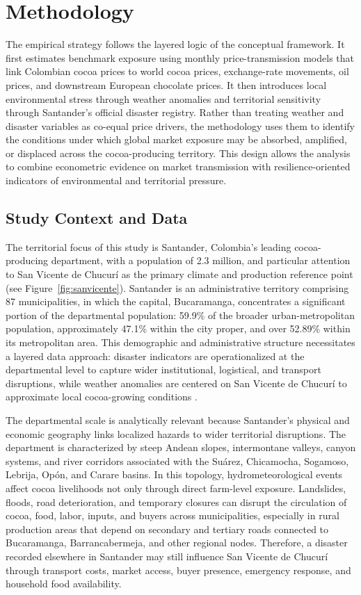 \documentclass[11pt]{article}
\begin{document}
\section{Methodology}
\label{sec:methods}
The empirical strategy follows the layered logic of the conceptual framework. It first estimates benchmark exposure using monthly price-transmission models that link Colombian cocoa prices to world cocoa prices, exchange-rate movements, oil prices, and downstream European chocolate prices. It then introduces local environmental stress through weather anomalies and territorial sensitivity through Santander's official disaster registry. Rather than treating weather and disaster variables as co-equal price drivers, the methodology uses them to identify the conditions under which global market exposure may be absorbed, amplified, or displaced across the cocoa-producing territory. This design allows the analysis to combine econometric evidence on market transmission with resilience-oriented indicators of environmental and territorial pressure.

\subsection{Study Context and Data}
\label{sec:data}
The territorial focus of this study is Santander, Colombia's leading cocoa-producing department, with a population of 2.3 million, and particular attention to San Vicente de Chucurí as the primary climate and production reference point (see Figure~\ref{fig:sanvicente}). Santander is an administrative territory comprising 87 municipalities, in which the capital, Bucaramanga, concentrates a significant portion of the departmental population: 59.9\% of the broader urban-metropolitan population, approximately 47.1\% within the city proper, and over 52.89\% within its metropolitan area. This demographic and administrative structure necessitates a layered data approach: disaster indicators are operationalized at the departmental level to capture wider institutional, logistical, and transport disruptions, while weather anomalies are centered on San Vicente de Chucurí to approximate local cocoa-growing conditions \citep{talero_sarmiento_etal_2025}.

The departmental scale is analytically relevant because Santander's physical and economic geography links localized hazards to wider territorial disruptions. The department is characterized by steep Andean slopes, intermontane valleys, canyon systems, and river corridors associated with the Suárez, Chicamocha, Sogamoso, Lebrija, Opón, and Carare basins. In this topology, hydrometeorological events affect cocoa livelihoods not only through direct farm-level exposure. Landslides, floods, road deterioration, and temporary closures can disrupt the circulation of cocoa, food, labor, inputs, and buyers across municipalities, especially in rural production areas that depend on secondary and tertiary roads connected to Bucaramanga, Barrancabermeja, and other regional nodes. Therefore, a disaster recorded elsewhere in Santander may still influence San Vicente de Chucurí through transport costs, market access, buyer presence, emergency response, and household food availability.
\end{document}
